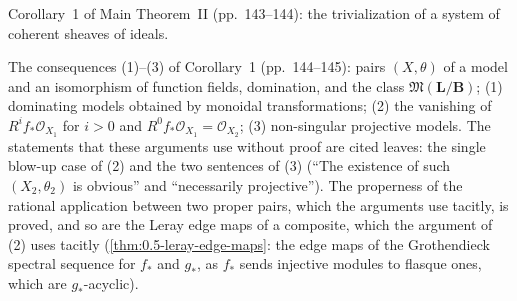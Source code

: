 






Corollary~1 of Main Theorem~II (pp.~143--144): the trivialization of a system of coherent sheaves of ideals.


The consequences (1)--(3) of Corollary~1 (pp.~144--145): pairs $(X,\theta)$ of a model and an isomorphism of function fields,
domination, and the class $\mathfrak M(\mathbf L/\mathbf B)$; (1) dominating models obtained by monoidal transformations;
(2) the vanishing of $R^if_*\mathcal O_{X_1}$ for $i>0$ and $R^0f_*\mathcal O_{X_1}=\mathcal O_{X_2}$; (3) non-singular
projective models. The statements that these arguments use without proof are cited leaves: the single blow-up case of (2)
and the two sentences of (3) (``The existence of such $(X_2,\theta_2)$ is obvious'' and ``necessarily projective''). The
properness of the rational application between two proper pairs, which the arguments use tacitly, is proved, and so are
the Leray edge maps of a composite, which the argument of (2) uses tacitly (\cref{thm:0.5-leray-edge-maps}: the edge maps of
the Grothendieck spectral sequence for $f_*$ and $g_*$, as $f_*$ sends injective modules to flasque ones, which are
$g_*$-acyclic).





